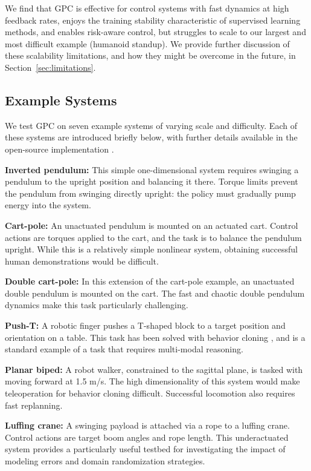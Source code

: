 \documentclass[letterpaper, 10 pt]{ieeeconf}
\begin{document}
We find that GPC is effective for control systems with fast dynamics at high feedback rates, enjoys the training stability characteristic of supervised learning methods, and enables risk-aware control, but struggles to scale to our largest and most difficult example (humanoid standup). We provide further discussion of these scalability limitations, and how they might be overcome in the future, in Section~\ref{sec:limitations}.

\subsection{Example Systems}\label{sec:experiments:sys}

We test GPC on seven example systems of varying scale and difficulty. Each of these systems are introduced briefly below, with further details available in the open-source implementation \cite{kurtz2025gpc}.

\textbf{Inverted pendulum:} This simple one-dimensional system requires swinging a pendulum to the upright position and balancing it there. Torque limits prevent the pendulum from swinging directly upright: the policy must gradually pump energy into the system. 

\textbf{Cart-pole:} An unactuated pendulum is mounted on an actuated cart. Control actions are torques applied to the cart, and the task is to balance the pendulum upright. While this is a relatively simple nonlinear system, obtaining successful human demonstrations would be difficult.

\textbf{Double cart-pole:} In this extension of the cart-pole example, an unactuated double pendulum is mounted on the cart. The fast and chaotic double pendulum dynamics make this task particularly challenging. 

\textbf{Push-T:} A robotic finger pushes a T-shaped block to a target position and orientation on a table. This task has been solved with behavior cloning \cite{chi2023diffusion}, and is a standard example of a task that requires multi-modal reasoning. 

\textbf{Planar biped:} A robot walker, constrained to the sagittal plane, is tasked with moving forward at 1.5 m/s. The high dimensionality of this system would make teleoperation for behavior cloning difficult. Successful locomotion also requires fast replanning.

\textbf{Luffing crane:} A swinging payload is attached via a rope to a luffing crane. Control actions are target boom angles and rope length. This underactuated system provides a particularly useful testbed for investigating the impact of modeling errors and domain randomization strategies.
\end{document}
